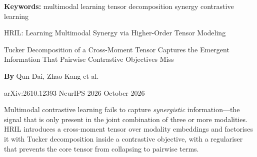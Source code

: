 \documentclass[10pt,twocolumn]{article}
\begin{document}
\setlength{\parindent}{0pt}
\setlength{\parskip}{4pt}

{\small\color{keywordgray}\textbf{Keywords:}
  multimodal learning \textbullet{}
  tensor decomposition \textbullet{}
  synergy \textbullet{}
  contrastive learning}\par\vspace{4pt}

{\LARGE\bfseries\raggedright
  HRIL: Learning Multimodal Synergy via Higher-Order Tensor Modeling}\par\vspace{4pt}

{\large\itshape\raggedright
  Tucker Decomposition of a Cross-Moment Tensor Captures the Emergent
  Information That Pairwise Contrastive Objectives Miss}\par\vspace{6pt}

{\small\textbf{By} Qun Dai, Zhao Kang et al.}\par\vspace{2pt}

{\small\color{keywordgray}arXiv:2610.12393 \textbullet{} NeurIPS 2026 \textbullet{} October 2026}
\par\vspace{2pt}\noindent{\color{rulered}\rule{\columnwidth}{0.6pt}}\vspace{6pt}

Multimodal contrastive learning fails to capture \emph{synergistic} information---the
signal that is only present in the joint combination of three or more
modalities. HRIL introduces a cross-moment tensor over modality embeddings
and factorises it with Tucker decomposition inside a contrastive objective,
with a regulariser that prevents the core tensor from collapsing to
pairwise terms.
\end{document}
